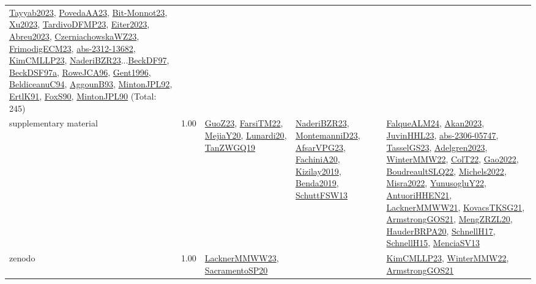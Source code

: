 {\begin{longtable}{p{3cm}r>{\raggedright\arraybackslash}p{6cm}>{\raggedright\arraybackslash}p{6cm}>{\raggedright\arraybackslash}p{8cm}}
\hyperref[detail:Tayyab2023]{Tayyab2023}, \hyperref[detail:PovedaAA23]{PovedaAA23}, \hyperref[detail:Bit-Monnot23]{Bit-Monnot23}, \hyperref[detail:Xu2023]{Xu2023}, \hyperref[detail:TardivoDFMP23]{TardivoDFMP23}, \hyperref[detail:Eiter2023]{Eiter2023}, \hyperref[detail:Abreu2023]{Abreu2023}, \hyperref[detail:CzerniachowskaWZ23]{CzerniachowskaWZ23}, \hyperref[detail:FrimodigECM23]{FrimodigECM23}, \hyperref[detail:abs-2312-13682]{abs-2312-13682}, \hyperref[detail:KimCMLLP23]{KimCMLLP23}, \hyperref[detail:NaderiBZR23]{NaderiBZR23}...\hyperref[detail:BeckDF97]{BeckDF97}, \hyperref[detail:BeckDSF97a]{BeckDSF97a}, \hyperref[detail:RoweJCA96]{RoweJCA96}, \hyperref[detail:Gent1996]{Gent1996}, \hyperref[detail:BeldiceanuC94]{BeldiceanuC94}, \hyperref[detail:AggounB93]{AggounB93}, \hyperref[detail:MintonJPL92]{MintonJPL92}, \hyperref[detail:ErtlK91]{ErtlK91}, \hyperref[detail:FoxS90]{FoxS90}, \hyperref[detail:MintonJPL90]{MintonJPL90} (Total: 245)\\
\index{supplementary material}\index{Benchmarks!supplementary material}supplementary material &  1.00 & \hyperref[detail:GuoZ23]{GuoZ23}, \hyperref[detail:FarsiTM22]{FarsiTM22}, \hyperref[detail:MejiaY20]{MejiaY20}, \hyperref[detail:Lunardi20]{Lunardi20}, \hyperref[detail:TanZWGQ19]{TanZWGQ19} & \hyperref[detail:NaderiBZR23]{NaderiBZR23}, \hyperref[detail:MontemanniD23]{MontemanniD23}, \hyperref[detail:AfsarVPG23]{AfsarVPG23}, \hyperref[detail:FachiniA20]{FachiniA20}, \hyperref[detail:Kizilay2019]{Kizilay2019}, \hyperref[detail:Benda2019]{Benda2019}, \hyperref[detail:SchuttFSW13]{SchuttFSW13} & \hyperref[detail:FalqueALM24]{FalqueALM24}, \hyperref[detail:Akan2023]{Akan2023}, \hyperref[detail:JuvinHHL23]{JuvinHHL23}, \hyperref[detail:abs-2306-05747]{abs-2306-05747}, \hyperref[detail:TasselGS23]{TasselGS23}, \hyperref[detail:Adelgren2023]{Adelgren2023}, \hyperref[detail:WinterMMW22]{WinterMMW22}, \hyperref[detail:ColT22]{ColT22}, \hyperref[detail:Gao2022]{Gao2022}, \hyperref[detail:BoudreaultSLQ22]{BoudreaultSLQ22}, \hyperref[detail:Michels2022]{Michels2022}, \hyperref[detail:Misra2022]{Misra2022}, \hyperref[detail:YunusogluY22]{YunusogluY22}, \hyperref[detail:AntuoriHHEN21]{AntuoriHHEN21}, \hyperref[detail:LacknerMMWW21]{LacknerMMWW21}, \hyperref[detail:KovacsTKSG21]{KovacsTKSG21}, \hyperref[detail:ArmstrongGOS21]{ArmstrongGOS21}, \hyperref[detail:MengZRZL20]{MengZRZL20}, \hyperref[detail:HauderBRPA20]{HauderBRPA20}, \hyperref[detail:SchnellH17]{SchnellH17}, \hyperref[detail:SchnellH15]{SchnellH15}, \hyperref[detail:MenciaSV13]{MenciaSV13}\\
\index{zenodo}\index{Benchmarks!zenodo}zenodo &  1.00 & \hyperref[detail:LacknerMMWW23]{LacknerMMWW23}, \hyperref[detail:SacramentoSP20]{SacramentoSP20} &  & \hyperref[detail:KimCMLLP23]{KimCMLLP23}, \hyperref[detail:WinterMMW22]{WinterMMW22}, \hyperref[detail:ArmstrongGOS21]{ArmstrongGOS21}\\
\end{longtable}
}

